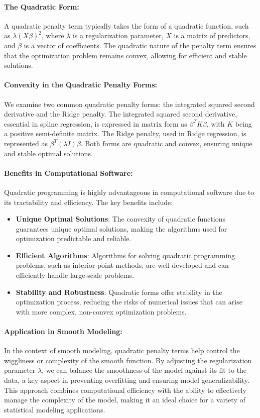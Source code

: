 \documentclass[12pt, twoside,hidelinks]{article}
\theoremstyle{definition}
\numberwithin{equation}{section}
\begin{document}
\paragraph{The Quadratic Form:}
A quadratic penalty term typically takes the form of a quadratic function, such as \( \lambda (X\beta)^2 \), where \( \lambda \) is a regularization parameter, \( X \) is a matrix of predictors, and \( \beta \) is a vector of coefficients. The quadratic nature of the penalty term ensures that the optimization problem remains convex, allowing for efficient and stable solutions.

\paragraph{Convexity in the Quadratic Penalty Forms:}
We examine two common quadratic penalty forms: the integrated squared second derivative and the Ridge penalty. The integrated squared second derivative, essential in spline regression, is expressed in matrix form as \( \beta^T K \beta \), with \( K \) being a positive semi-definite matrix. The Ridge penalty, used in Ridge regression, is represented as \( \beta^T (\lambda I) \beta \). Both forms are quadratic and convex, ensuring unique and stable optimal solutions.

\paragraph{Benefits in Computational Software:}
Quadratic programming is highly advantageous in computational software due to its tractability and efficiency. The key benefits include:
\begin{itemize}
    \item \textbf{Unique Optimal Solutions}: The convexity of quadratic functions guarantees unique optimal solutions, making the algorithms used for optimization predictable and reliable.
    \item \textbf{Efficient Algorithms}: Algorithms for solving quadratic programming problems, such as interior-point methods, are well-developed and can efficiently handle large-scale problems.
    \item \textbf{Stability and Robustness}: Quadratic forms offer stability in the optimization process, reducing the risks of numerical issues that can arise with more complex, non-convex optimization problems.
\end{itemize}

\paragraph{Application in Smooth Modeling:}
In the context of smooth modeling, quadratic penalty terms help control the wiggliness or complexity of the smooth function. By adjusting the regularization parameter \( \lambda \), we can balance the smoothness of the model against its fit to the data, a key aspect in preventing overfitting and ensuring model generalizability. This approach combines computational efficiency with the ability to effectively manage the complexity of the model, making it an ideal choice for a variety of statistical modeling applications.
\end{document}
